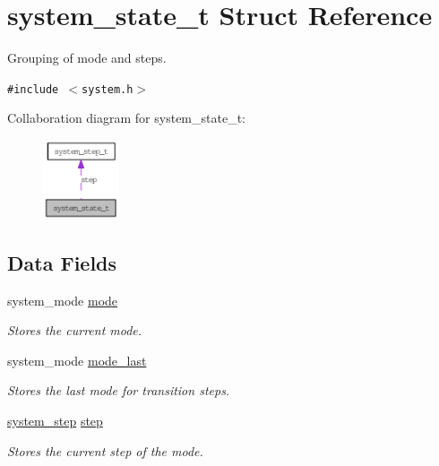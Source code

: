 \hypertarget{structsystem__state__t}{
\section{system\_\-state\_\-t Struct Reference}
\label{structsystem__state__t}
}
Grouping of mode and steps.  


{\tt \#include $<$system.h$>$}

Collaboration diagram for system\_\-state\_\-t:\nopagebreak
\begin{figure}[H]
\begin{center}
\leavevmode
\includegraphics[width=64pt]{structsystem__state__t__coll__graph}
\end{center}
\end{figure}
\subsection*{Data Fields}
\begin{CompactItemize}
\item 
\hypertarget{structsystem__state__t_903c7b848a8b43a1b50e2fbb54a7cb7d}{
system\_\-mode \hyperlink{structsystem__state__t_903c7b848a8b43a1b50e2fbb54a7cb7d}{mode}}
\label{structsystem__state__t_903c7b848a8b43a1b50e2fbb54a7cb7d}

\begin{CompactList}\small\item\em Stores the current mode. \item\end{CompactList}\item 
\hypertarget{structsystem__state__t_d5b7e91c9a338f631520d1bad5912c8e}{
system\_\-mode \hyperlink{structsystem__state__t_d5b7e91c9a338f631520d1bad5912c8e}{mode\_\-last}}
\label{structsystem__state__t_d5b7e91c9a338f631520d1bad5912c8e}

\begin{CompactList}\small\item\em Stores the last mode for transition steps. \item\end{CompactList}\item 
\hypertarget{structsystem__state__t_3ce91eb47370ddf1107ad2d1cd369255}{
\hyperlink{structsystem__step__t}{system\_\-step} \hyperlink{structsystem__state__t_3ce91eb47370ddf1107ad2d1cd369255}{step}}
\label{structsystem__state__t_3ce91eb47370ddf1107ad2d1cd369255}

\begin{CompactList}\small\item\em Stores the current step of the mode. \item\end{CompactList}\end{CompactItemize}


